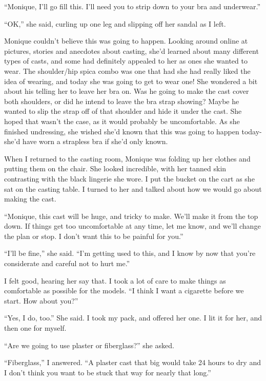 ``Monique, I'll go fill this. I'll need you to strip down to your bra and underwear.''

``OK,'' she said, curling up one leg and slipping off her sandal as I left.

\begin{thought}
Monique couldn't believe this was going to happen. Looking around online at pictures,
stories and anecdotes about casting, she'd learned about many different types of casts, and some
had definitely appealed to her as ones she wanted to wear. The shoulder/hip spica combo was one
that had she had really liked the idea of wearing, and today she was going to get to wear one!
She wondered a bit about his telling her to leave her bra on. Was he going to make the cast
cover both shoulders, or did he intend to leave the bra strap showing? Maybe he wanted to slip
the strap off of that shoulder and hide it under the cast. She hoped that wasn't the case, as it
would probably be uncomfortable. As she finished undressing, she wished she'd known that this
was going to happen today- she'd have worn a strapless bra if she'd only known.
\end{thought}

When I returned to the casting room, Monique was folding up her clothes and putting them
on the chair. She looked incredible, with her tanned skin contrasting with the black lingerie
she wore. I put the bucket on the cart as she sat on the casting table. I turned to her and
talked about how we would go about making the cast.

``Monique, this cast will be huge, and tricky to make. We'll make it from the top down. If
things get too uncomfortable at any time, let me know, and we'll change the plan or stop. I
don't want this to be painful for you.''

``I'll be fine,'' she said. ``I'm getting used to this, and I know by now that you're
considerate and careful not to hurt me.''

I felt good, hearing her say that. I took a lot of care to make things as comfortable as
possible for the models. ``I think I want a cigarette before we start. How about you?''

``Yes, I do, too.'' She said. I took my pack, and offered her one. I lit it for her, and
then one for myself.

``Are we going to use plaster or fiberglass?'' she asked.

``Fiberglass,'' I answered. ``A plaster cast that big would take 24 hours to dry and I
don't think you want to be stuck that way for nearly that long.''

